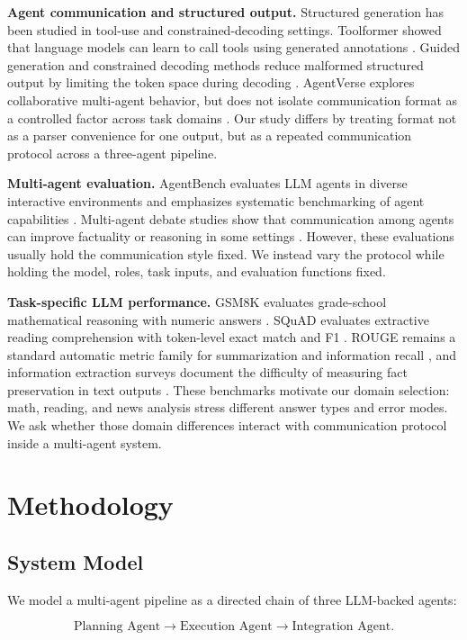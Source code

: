 \documentclass[11pt]{article}
\begin{document}
\textbf{Agent communication and structured output.} Structured generation has been studied in tool-use and constrained-decoding settings. Toolformer showed that language models can learn to call tools using generated annotations \cite{toolformer}. Guided generation and constrained decoding methods reduce malformed structured output by limiting the token space during decoding \cite{guided}. AgentVerse explores collaborative multi-agent behavior, but does not isolate communication format as a controlled factor across task domains \cite{agentverse}. Our study differs by treating format not as a parser convenience for one output, but as a repeated communication protocol across a three-agent pipeline.

\textbf{Multi-agent evaluation.} AgentBench evaluates LLM agents in diverse interactive environments and emphasizes systematic benchmarking of agent capabilities \cite{agentbench}. Multi-agent debate studies show that communication among agents can improve factuality or reasoning in some settings \cite{debate}. However, these evaluations usually hold the communication style fixed. We instead vary the protocol while holding the model, roles, task inputs, and evaluation functions fixed.

\textbf{Task-specific LLM performance.} GSM8K evaluates grade-school mathematical reasoning with numeric answers \cite{gsm8k}. SQuAD evaluates extractive reading comprehension with token-level exact match and F1 \cite{squad}. ROUGE remains a standard automatic metric family for summarization and information recall \cite{rouge}, and information extraction surveys document the difficulty of measuring fact preservation in text outputs \cite{ie}. These benchmarks motivate our domain selection: math, reading, and news analysis stress different answer types and error modes. We ask whether those domain differences interact with communication protocol inside a multi-agent system.

\section{Methodology}

\subsection{System Model}

We model a multi-agent pipeline as a directed chain of three LLM-backed agents:

\[
\text{Planning Agent} \rightarrow \text{Execution Agent} \rightarrow \text{Integration Agent}.
\]
\end{document}
